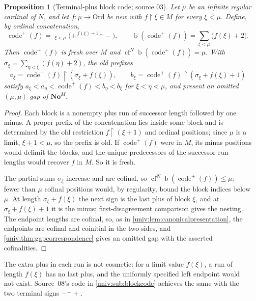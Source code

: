 \documentclass[11pt,letterpaper]{article}
\numberwithin{equation}{section}
\newtheorem{proposition}[proposition]{Proposition}
\theoremstyle{definition}
\theoremstyle{remark}
\newcommand{\No}{\mathbf{No}}
\newcommand{\NoM}{\No^{M}}
\newcommand{\Ord}{\mathrm{Ord}}
\newcommand{\bd}{\operatorname{b}}
\newcommand{\cf}{\operatorname{cf}}
\newcommand{\codeplus}{\operatorname{code}^{+}}
\newcommand{\res}{\mathbin{\upharpoonright}}
\newcommand{\cat}{\mathbin{{}^{\frown}}}
\begin{document}
\begin{proposition}[Terminal-plus block code; source 03]\label{univ:prop:blockcodeplus}
Let $\mu$ be an infinite regular cardinal of $N$, and let $f:\mu\to\Ord$ be new
with $f\res\xi\in M$ for every $\xi<\mu$. Define, by ordinal concatenation,
\[
 \codeplus(f)=\mathop{\cat}_{\xi<\mu}\bigl(+^{\,f(\xi)+1}\cat-\bigr),
 \qquad
 \bd(\codeplus(f))=\sum_{\xi<\mu}\bigl(f(\xi)+2\bigr).
\]
Then $\codeplus(f)$ is fresh over $M$ and $\cf^N\bd(\codeplus(f))=\mu$. With
$\sigma_\xi=\sum_{\eta<\xi}(f(\eta)+2)$, the old prefixes
\[
 a_\xi=\codeplus(f)\res(\sigma_\xi+f(\xi)),\qquad
 b_\xi=\codeplus(f)\res(\sigma_\xi+f(\xi)+1)
\]
satisfy $a_\xi<a_\eta<\codeplus(f)<b_\eta<b_\xi$ for $\xi<\eta<\mu$, and
present an omitted $(\mu,\mu)$ gap of $\NoM$.
\end{proposition}
\begin{proof}
Each block is a nonempty plus run of successor length followed by one minus.
A proper prefix of the concatenation lies inside some block and is determined
by the old restriction $f\res(\xi+1)$ and ordinal positions; since $\mu$ is a
limit, $\xi+1<\mu$, so the prefix is old. If $\codeplus(f)$ were in $M$, its
minus positions would delimit the blocks, and the unique predecessors of the
successor run lengths would recover $f$ in $M$. So it is fresh.

The partial sums $\sigma_\xi$ increase and are cofinal, so
$\cf^N\bd(\codeplus(f))\le\mu$; fewer than $\mu$ cofinal positions would, by
regularity, bound the block indices below $\mu$. At length $\sigma_\xi+f(\xi)$ the
next sign is the last plus of block $\xi$, and at $\sigma_\xi+f(\xi)+1$ it is the
minus; first-disagreement comparison gives the nesting. The endpoint lengths
are cofinal, so, as in \cref{univ:lem:canonicalpresentation}, the endpoints are
cofinal and coinitial in the two sides, and
\cref{univ:thm:gapcorrespondence} gives an omitted gap with the asserted
cofinalities.
\end{proof}

The extra plus in each run is not cosmetic: for a limit value $f(\xi)$, a run
of length $f(\xi)$ has no last plus, and the uniformly specified left endpoint
would not exist. Source~08's code in \cref{univ:sub:blockcode} achieves the
same with the two terminal signs $-\cat+$.
\end{document}
